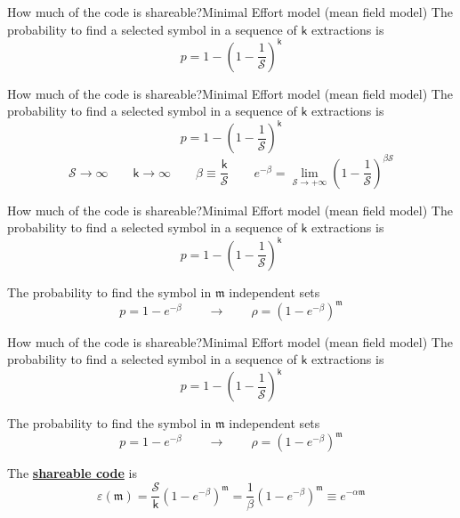\documentclass[11pt,svgnames]{beamer}
\renewcommand{\kappa}{\mathsf k}
\newcommand{\Esse}{\mathcal S}
\newcommand{\emme}{\mathfrak m}
\begin{document}
\begin{frame}[t,noframenumbering]{How much of the code is shareable?}{Minimal Effort model (mean field model)}
The probability to find a selected symbol in a sequence of $\kappa$ extractions is
\[ p = 1 - \left ( 1 -\frac{1}{\Esse} \right )^\kappa \]
\end{frame}
\begin{frame}[t,noframenumbering]{How much of the code is shareable?}{Minimal Effort model (mean field model)}
The probability to find a selected symbol in a sequence of $\kappa$ extractions is
\[ p = 1 - \left ( 1 -\frac{1}{\Esse} \right )^\kappa \]
\vspace{1.5cm}
\small
\[\Esse \to \infty \qquad \kappa \to \infty \qquad \beta \equiv \frac{\kappa}{\Esse} \qquad e^{-\beta}= \lim_{\Esse \to +\infty} \left( 1 - \frac{1}{\Esse} \right)^{\beta \Esse}\]
\normalsize
\end{frame}
\begin{frame}[t,noframenumbering]{How much of the code is shareable?}{Minimal Effort model (mean field model)}
The probability to find a selected symbol in a sequence of $\kappa$ extractions is
\[ p = 1 - \left ( 1 -\frac{1}{\Esse} \right )^\kappa \]

The probability to find the symbol in $\emme$ independent sets
\[ p = 1 - e^{-\beta} \qquad \to \qquad \rho = \left(1 - e^{-\beta}\right)^{\emme}\]
\end{frame}
\begin{frame}[t,noframenumbering]{How much of the code is shareable?}{Minimal Effort model (mean field model)}
The probability to find a selected symbol in a sequence of $\kappa$ extractions is
\[ p = 1 - \left ( 1 -\frac{1}{\Esse} \right )^\kappa \]

The probability to find the symbol in $\emme$ independent sets
\[ p = 1 - e^{-\beta} \qquad \to \qquad \rho = \left(1 - e^{-\beta}\right)^{\emme}\]

\vspace{0.5cm}
\Large The \underline{\textbf{shareable code}} is \normalsize
\[ \varepsilon (\emme) = \frac{\Esse}{\kappa} \left(1 - e^{-\beta}\right)^{\emme} = \frac{1}{\beta} \left(1 - e^{-\beta}\right)^{\emme} \equiv e^{-\alpha \emme}\]

\end{frame}
\end{document}
